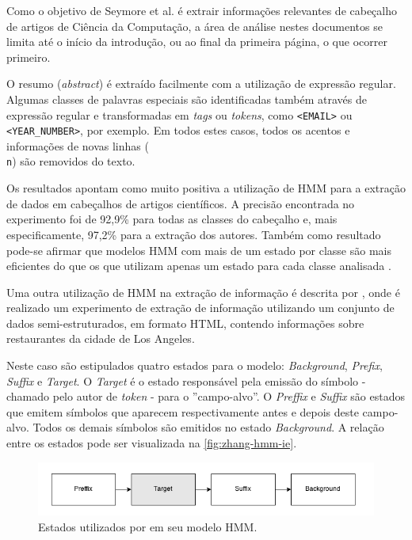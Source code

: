 \begin{textnew}
\begin{enumerate}
\end{enumerate}

Como o objetivo de Seymore et al. é extrair informações relevantes de cabeçalho de artigos de Ciência da Computação, a área de análise nestes documentos se limita até o início da introdução, ou ao final da primeira página, o que ocorrer primeiro.

O resumo (\textit{abstract}) é extraído facilmente com a utilização de expressão regular. Algumas classes de palavras especiais são identificadas também através de expressão regular e transformadas em \textit{tags} ou \textit{tokens}, como \texttt{<EMAIL>} ou \texttt{<YEAR\_NUMBER>}, por exemplo. Em todos estes casos, todos os acentos e informações de novas linhas (\texttt{\\n}) são removidos do texto.

Os resultados apontam como muito positiva a utilização de HMM para a extração de dados em cabeçalhos de artigos científicos. A precisão encontrada no experimento foi de 92,9\% para todas as classes do cabeçalho e, mais especificamente, 97,2\% para a extração dos autores. Também como resultado pode-se afirmar que modelos HMM com mais de um estado por classe são mais eficientes do que os que utilizam apenas um estado para cada classe analisada \cite{Seymore-HMM-IE}.


Uma outra utilização de HMM na extração de informação é descrita por \cite{Zhang-HMM-IE}, onde é realizado um experimento de extração de informação utilizando um conjunto de dados semi-estruturados, em formato HTML, contendo informações sobre restaurantes da cidade de Los Angeles.

Neste caso são estipulados quatro estados para o modelo: \textit{Background}, \textit{Prefix}, \textit{Suffix} e \textit{Target}. O \textit{Target} é o estado responsável pela emissão do símbolo - chamado pelo autor de \textit{token} - para o ''campo-alvo''. O \textit{Preffix} e \textit{Suffix} são estados que emitem símbolos que aparecem respectivamente antes e depois deste campo-alvo. Todos os demais símbolos são emitidos no estado \textit{Background}. A relação entre os estados pode ser visualizada na \autoref{fig:zhang-hmm-ie}.

\begin{figure}
	\centering
	\caption{Estados utilizados por \cite{Zhang-HMM-IE} em seu modelo HMM.}
	\label{fig:zhang-hmm-ie}
	\includegraphics[width=0.8\linewidth]{./assets/images/zhang-hmm-ie}
\end{figure}


\end{textnew}
